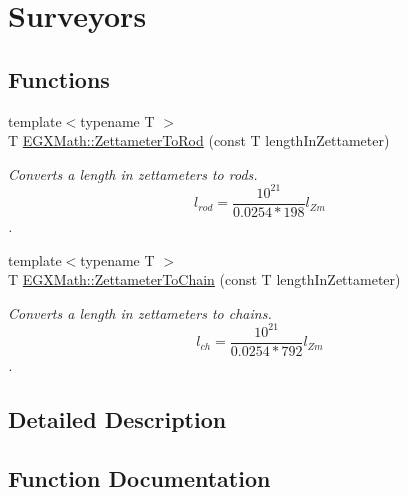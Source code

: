 \hypertarget{group___e_g_x_math-_conversions-_length_conversions-_s_i-_zettameter-_surveyors}{}\section{Surveyors}
\label{group___e_g_x_math-_conversions-_length_conversions-_s_i-_zettameter-_surveyors}
\subsection*{Functions}
\begin{DoxyCompactItemize}
\item 
{\footnotesize template$<$typename T $>$ }\\T \mbox{\hyperlink{group___e_g_x_math-_conversions-_length_conversions-_s_i-_zettameter-_surveyors_gac9031bf1465b8a56ab426ac20d256741}{E\+G\+X\+Math\+::\+Zettameter\+To\+Rod}} (const T length\+In\+Zettameter)
\begin{DoxyCompactList}\small\item\em Converts a length in zettameters to rods. \[ l_{rod}= \frac{10^{21}}{0.0254 * 198} l_{Zm} \]. \end{DoxyCompactList}\item 
{\footnotesize template$<$typename T $>$ }\\T \mbox{\hyperlink{group___e_g_x_math-_conversions-_length_conversions-_s_i-_zettameter-_surveyors_ga97af95fc842ded65d430a539ef8a3571}{E\+G\+X\+Math\+::\+Zettameter\+To\+Chain}} (const T length\+In\+Zettameter)
\begin{DoxyCompactList}\small\item\em Converts a length in zettameters to chains. \[ l_{ch}= \frac{10^{21}}{0.0254 * 792} l_{Zm} \]. \end{DoxyCompactList}\end{DoxyCompactItemize}


\subsection{Detailed Description}


\subsection{Function Documentation}
\mbox{\label{group___e_g_x_math-_conversions-_length_conversions-_s_i-_zettameter-_surveyors_ga97af95fc842ded65d430a539ef8a3571}} 

